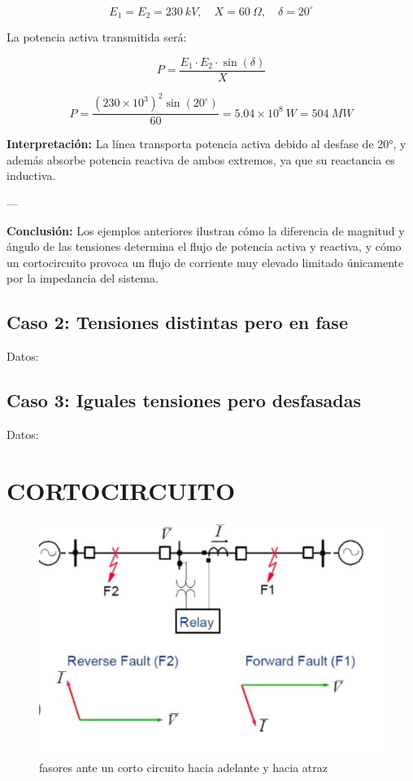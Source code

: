 \documentclass[a5paper]{book}%
\begin{document}
\[
E_{1} = E_{2} = 230~kV, \quad X = 60~\Omega, \quad \delta = 20^\circ
\]

La potencia activa transmitida será:

\[
P = \dfrac{E_{1} \cdot E_{2} \cdot \sin(\delta)}{X}
\]

\[
P = \dfrac{(230 \times 10^{3})^{2} \sin(20^\circ)}{60} = 5.04 \times 10^{8}~W = 504~MW
\]

\textbf{Interpretación:}  
La línea transporta potencia activa debido al desfase de 20°, y además absorbe potencia reactiva de ambos extremos, ya que su reactancia es inductiva.

---

\textbf{Conclusión:}  
Los ejemplos anteriores ilustran cómo la diferencia de magnitud y ángulo de las tensiones determina el flujo de potencia activa y reactiva, y cómo un cortocircuito provoca un flujo de corriente muy elevado limitado únicamente por la impedancia del sistema.




\subsection{Caso 2: Tensiones distintas pero en fase}

Datos:


\subsection{Caso 3: Iguales tensiones pero desfasadas}

Datos:


\section{CORTOCIRCUITO}

\begin{figure}[H]
	\centering
	\caption{fasores ante un corto circuito hacia adelante y hacia atraz}
	\label{fig:fasores}
	\includegraphics[width=\linewidth]{cortcircuito}
\end{figure}
\end{document}
